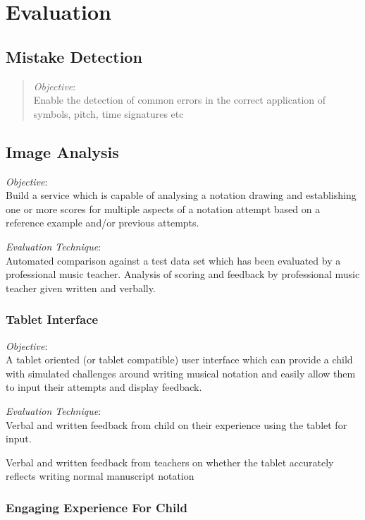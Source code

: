 \chapter{Evaluation}

\section{Mistake Detection}

\begin{quotation}
  \emph{Objective}: \\ 
Enable the detection of common errors in the correct application of symbols, pitch, time signatures etc
\end{quotation}

\section{Image Analysis}

\emph{Objective}: \\
Build a service which is capable of analysing a notation drawing and establishing one or more scores for multiple aspects of a notation attempt based on a reference example and/or previous attempts.

\emph{Evaluation Technique}: \\
Automated comparison against a test data set which has been evaluated by a professional music teacher.
Analysis of scoring and feedback by professional music teacher given written and verbally.

\subsection{Tablet Interface}

\emph{Objective}: \\
A tablet oriented (or tablet compatible) user interface which can provide a child with simulated challenges around writing musical notation and easily allow them to input their attempts and display feedback.

\emph{Evaluation Technique}: \\
Verbal and written feedback from child on their experience using the tablet for input.

Verbal and written feedback from teachers on whether the tablet accurately reflects writing normal manuscript notation

\subsection{Engaging Experience For Child}

